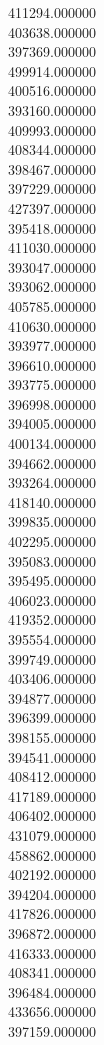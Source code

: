 411294.000000\\
403638.000000\\
397369.000000\\
499914.000000\\
400516.000000\\
393160.000000\\
409993.000000\\
408344.000000\\
398467.000000\\
397229.000000\\
427397.000000\\
395418.000000\\
411030.000000\\
393047.000000\\
393062.000000\\
405785.000000\\
410630.000000\\
393977.000000\\
396610.000000\\
393775.000000\\
396998.000000\\
394005.000000\\
400134.000000\\
394662.000000\\
393264.000000\\
418140.000000\\
399835.000000\\
402295.000000\\
395083.000000\\
395495.000000\\
406023.000000\\
419352.000000\\
395554.000000\\
399749.000000\\
403406.000000\\
394877.000000\\
396399.000000\\
398155.000000\\
394541.000000\\
408412.000000\\
417189.000000\\
406402.000000\\
431079.000000\\
458862.000000\\
402192.000000\\
394204.000000\\
417826.000000\\
396872.000000\\
416333.000000\\
408341.000000\\
396484.000000\\
433656.000000\\
397159.000000\\
